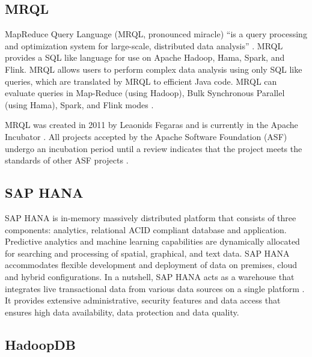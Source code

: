 \subsection{MRQL}

     MapReduce Query Language (MRQL, pronounced miracle) ``is a query
     processing and optimization system for large-scale, distributed
     data analysis'' \cite{www-apachemrql}. MRQL provides a SQL
     like language for use on Apache Hadoop, Hama, Spark, and Flink.
     MRQL allows users to perform complex data analysis using only SQL
     like queries, which are translated by MRQL to efficient Java
     code. MRQL can evaluate queries in Map-Reduce (using Hadoop), Bulk
     Synchronous Parallel (using Hama), Spark, and Flink modes
     \cite{www-apachemrql}.

     MRQL was created in 2011 by Leaonids
     Fegaras and is currently in the Apache
     Incubator \cite{www-mrqlhadoop}.  All projects accepted by the Apache
     Software
     Foundation (ASF) undergo an incubation period until a review
     indicates that the project meets the standards of other ASF
     projects \cite{www-apacheincubator}.

     \pv

\subsection{SAP HANA}

     SAP HANA is in-memory massively
     distributed platform that consists of three components:
     analytics, relational ACID compliant database and
     application\cite{www-sap-hana}. Predictive analytics and machine learning
     capabilities are dynamically allocated for searching and
     processing of spatial, graphical, and text data. 
     SAP HANA accommodates flexible development and deployment of 
     data on premises, cloud and hybrid configurations.  In a 
     nutshell, SAP HANA acts as a warehouse that integrates live 
     transactional data from various data sources on a single 
     platform \cite{olofson-2014}. It provides extensive 
     administrative, security features and data access that ensures 
     high data availability, data protection and data quality.

     \pv
	 

\subsection{HadoopDB}
    
